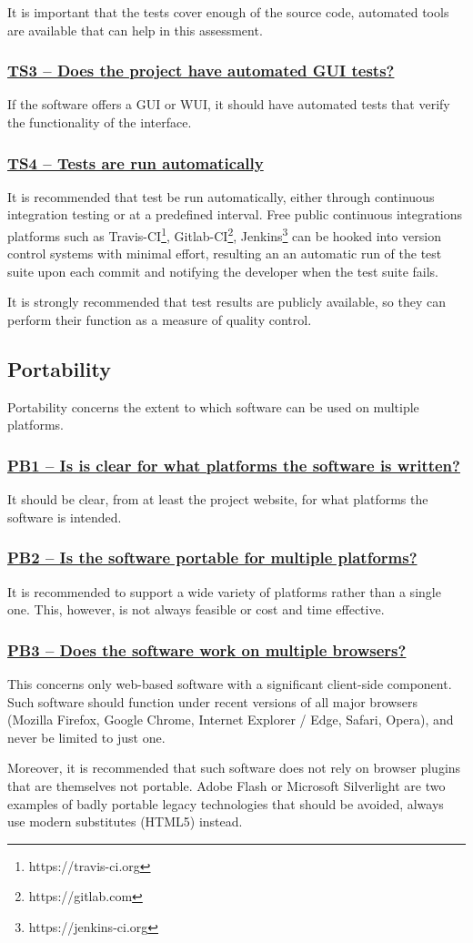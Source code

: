 \documentclass[a4paper,11pt]{article}
\newcommand{\criterion}[1]{\subsubsection*{\underline{#1}}}
\begin{document}
It is important that the tests cover enough of the source code, automated tools
are available that can help in this assessment.

\criterion{TS3 -- Does the project have automated GUI tests?}

If the software offers a GUI or WUI, it should have automated tests that verify
the functionality of the interface.

\criterion{TS4 -- Tests are run automatically}

It is recommended that test be run automatically, either through continuous
integration testing or at a predefined interval. Free public continuous integrations
platforms such as Travis-CI\footnote{https://travis-ci.org},
Gitlab-CI\footnote{https://gitlab.com},
Jenkins\footnote{https://jenkins-ci.org} can be hooked into version control
systems with minimal effort, resulting an an automatic run of the test suite
upon each commit and notifying the developer when the test suite fails.

It is strongly recommended that test results are publicly available, so they can
perform their function as a measure of quality control.


\subsection{Portability}

Portability concerns the extent to which software can be used on multiple
platforms. 

\criterion{PB1 -- Is is clear for what platforms the software is written?}

It should be clear, from at least the project website, for what platforms the software
is intended.

\criterion{PB2 -- Is the software portable for multiple platforms?}

It is recommended to support a wide variety of platforms rather than a single
one. This, however, is not always feasible or cost and time effective.

\criterion{PB3 -- Does the software work on multiple browsers?}

This concerns only web-based software with a significant client-side component.
Such software should function under recent versions of all major browsers
(Mozilla Firefox, Google Chrome, Internet Explorer / Edge, Safari, Opera), and
never be limited to just one.

Moreover, it is recommended that such software does not rely on browser plugins that
are themselves not portable. Adobe Flash or Microsoft Silverlight are two
examples of badly portable legacy technologies that should be avoided, always use
modern substitutes (HTML5) instead.
\end{document}

